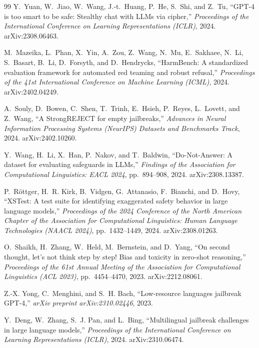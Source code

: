 \documentclass[11pt]{article}
\begin{document}
\begin{thebibliography}{99}
Y.~Yuan, W.~Jiao, W.~Wang, J.-t.~Huang, P.~He, S.~Shi, and Z.~Tu,
``{GPT-4} is too smart to be safe: Stealthy chat with {LLMs} via cipher,''
\textit{Proceedings of the International Conference on Learning Representations (ICLR)}, 2024. arXiv:2308.06463.

M.~Mazeika, L.~Phan, X.~Yin, A.~Zou, Z.~Wang, N.~Mu, E.~Sakhaee, N.~Li, S.~Basart, B.~Li, D.~Forsyth, and D.~Hendrycks,
``{HarmBench}: A standardized evaluation framework for automated red teaming and robust refusal,''
\textit{Proceedings of the 41st International Conference on Machine Learning (ICML)}, 2024. arXiv:2402.04249.

A.~Souly, D.~Bowen, C.~Shen, T.~Trinh, E.~Hsieh, P.~Reyes, L.~Lovett, and Z.~Wang,
``A {StrongREJECT} for empty jailbreaks,''
\textit{Advances in Neural Information Processing Systems (NeurIPS) Datasets and Benchmarks Track}, 2024. arXiv:2402.10260.

Y.~Wang, H.~Li, X.~Han, P.~Nakov, and T.~Baldwin,
``Do-Not-Answer: A dataset for evaluating safeguards in {LLMs},''
\textit{Findings of the Association for Computational Linguistics: EACL 2024}, pp.~894--908, 2024. arXiv:2308.13387.

P.~R{\"o}ttger, H.~R. Kirk, B.~Vidgen, G.~Attanasio, F.~Bianchi, and D.~Hovy,
``{XSTest}: A test suite for identifying exaggerated safety behavior in large language models,''
\textit{Proceedings of the 2024 Conference of the North American Chapter of the Association for Computational Linguistics: Human Language Technologies (NAACL 2024)}, pp.~1432--1449, 2024. arXiv:2308.01263.

O.~Shaikh, H.~Zhang, W.~Held, M.~Bernstein, and D.~Yang,
``On second thought, let's not think step by step! Bias and toxicity in zero-shot reasoning,''
\textit{Proceedings of the 61st Annual Meeting of the Association for Computational Linguistics (ACL 2023)}, pp.~4454--4470, 2023. arXiv:2212.08061.

Z.-X. Yong, C.~Menghini, and S.~H. Bach,
``Low-resource languages jailbreak {GPT-4},''
\textit{arXiv preprint arXiv:2310.02446}, 2023.

Y.~Deng, W.~Zhang, S.~J. Pan, and L.~Bing,
``Multilingual jailbreak challenges in large language models,''
\textit{Proceedings of the International Conference on Learning Representations (ICLR)}, 2024. arXiv:2310.06474.


\end{thebibliography}
\end{document}
